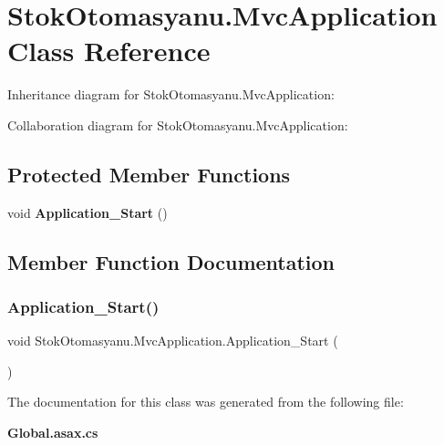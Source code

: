 \section{Stok\+Otomasyanu.\+Mvc\+Application Class Reference}
\label{class_stok_otomasyanu_1_1_mvc_application}


Inheritance diagram for Stok\+Otomasyanu.\+Mvc\+Application\+:


Collaboration diagram for Stok\+Otomasyanu.\+Mvc\+Application\+:
\subsection*{Protected Member Functions}
\begin{DoxyCompactItemize}
\item 
void \textbf{ Application\+\_\+\+Start} ()
\end{DoxyCompactItemize}


\subsection{Member Function Documentation}
\mbox{\label{class_stok_otomasyanu_1_1_mvc_application_a156a044e8bfbf09c158c0315411ea6b0}} 
\subsubsection{Application\+\_\+\+Start()}
{\footnotesize\ttfamily void Stok\+Otomasyanu.\+Mvc\+Application.\+Application\+\_\+\+Start (\begin{DoxyParamCaption}{ }\end{DoxyParamCaption})\hspace{0.3cm}{\ttfamily [protected]}}



The documentation for this class was generated from the following file\+:\begin{DoxyCompactItemize}
\item 
\textbf{ Global.\+asax.\+cs}\end{DoxyCompactItemize}
